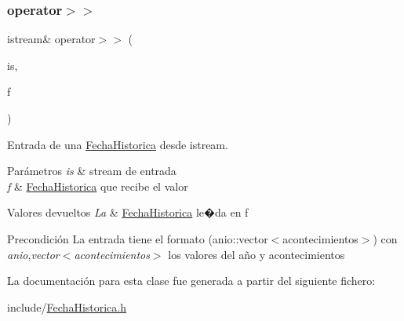 \subsubsection{\texorpdfstring{operator$>$$>$}{operator>>}}
{\footnotesize\ttfamily istream\& operator$>$$>$ (\begin{DoxyParamCaption}\item[{istream \&}]{is,  }\item[{\hyperlink{classFechaHistorica}{Fecha\+Historica} \&}]{f }\end{DoxyParamCaption})\hspace{0.3cm}{\ttfamily [friend]}}



Entrada de una \hyperlink{classFechaHistorica}{Fecha\+Historica} desde istream. 


\begin{DoxyParams}{Parámetros}
{\em is} & stream de entrada \\
\hline
{\em f} & \hyperlink{classFechaHistorica}{Fecha\+Historica} que recibe el valor \\
\hline
\end{DoxyParams}

\begin{DoxyRetVals}{Valores devueltos}
{\em La} & \hyperlink{classFechaHistorica}{Fecha\+Historica} le�da en f \\
\hline
\end{DoxyRetVals}
\begin{DoxyPrecond}{Precondición}
La entrada tiene el formato (anio\+::vector$<$acontecimientos$>$) con {\itshape anio},{\itshape vector$<$acontecimientos$>$} los valores del año y acontecimientos 
\end{DoxyPrecond}


La documentación para esta clase fue generada a partir del siguiente fichero\+:\begin{DoxyCompactItemize}
\item 
include/\hyperlink{FechaHistorica_8h}{Fecha\+Historica.\+h}\end{DoxyCompactItemize}

